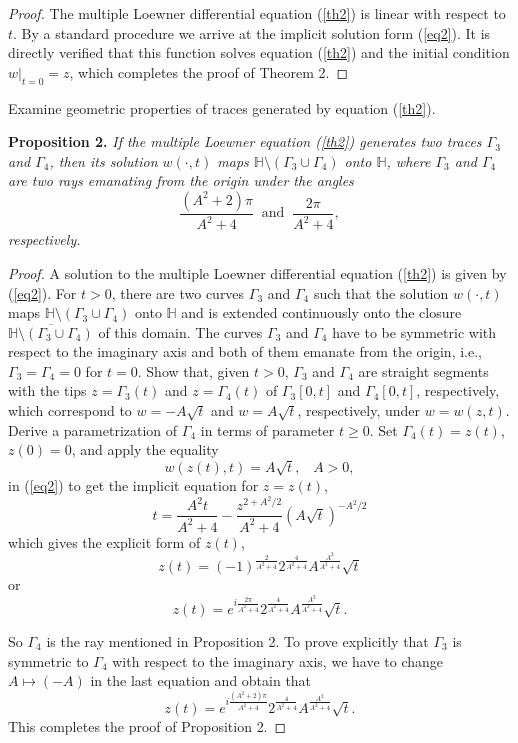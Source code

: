 \documentclass[
11pt,%
tightenlines,%
twoside,%
onecolumn,%
nofloats,%
nobibnotes,%
nofootinbib,%
superscriptaddress,%
noshowpacs,%
centertags]%
{revtex4}
\begin{document}
\begin{proof} The multiple Loewner differential equation (\ref{th2}) is linear with respect to $t$. By a standard procedure we arrive at the implicit solution form (\ref{eq2}). It is directly verified that this function solves equation (\ref{th2}) and the initial condition $w|_{t=0}=z$, which completes the proof of Theorem 2.
\end{proof}

Examine geometric properties of traces generated by equation (\ref{th2}).

{\bf Proposition 2.} {\it If the multiple Loewner equation (\ref{th2}) generates two traces $\Gamma_3$ and $\Gamma_4$, then its solution $w(\cdot,t)$ maps $\mathbb H\setminus(\Gamma_3\cup\Gamma_4)$ onto $\mathbb H$, where $\Gamma_3$ and $\Gamma_4$ are two rays emanating from the origin under the angles $$\frac{(A^2+2)\pi}{A^2+4}\;\;\text{and}\;\;\frac{2\pi}{A^2+4},$$ respectively.}

\begin{proof}

A solution to the multiple Loewner differential equation (\ref{th2}) is given by (\ref{eq2}). For $t>0$, there are two curves $\Gamma_3$ and $\Gamma_4$ such that the solution $w(\cdot,t)$ maps $\mathbb H\setminus(\Gamma_3\cup\Gamma_4)$ onto $\mathbb H$ and is extended continuously onto the closure $\overline{\mathbb H\setminus(\Gamma_3\cup\Gamma_4)}$ of this domain. The curves $\Gamma_3$ and $\Gamma_4$ have to be symmetric with respect to the imaginary axis and both of them emanate from the origin, i.e., $\Gamma_3=\Gamma_4=0$ for $t=0$. Show that, given $t>0$, $\Gamma_3$ and $\Gamma_4$ are straight segments with the tips $z=\Gamma_3(t)$ and $z=\Gamma_4(t)$ of $\Gamma_3[0,t]$ and $\Gamma_4[0,t]$, respectively, which correspond to $w=-A\sqrt t$ and $w=A\sqrt t$, respectively, under $w=w(z,t)$. Derive a parametrization of $\Gamma_4$ in terms of parameter $t\geq0$. Set $\Gamma_4(t)=z(t)$, $z(0)=0$, and apply the equality $$w(z(t),t)=A\sqrt t,\;\;\;A>0,$$ in (\ref{eq2}) to get the implicit equation for $z=z(t)$, $$t=\frac{A^2t}{A^2+4}-\frac{z^{2+A^2/2}}{A^2+4}(A\sqrt t)^{-A^2/2}$$ which gives the explicit form of $z(t)$, $$z(t)=(-1)^{\frac{2}{A^2+4}}2^{\frac{4}{A^2+4}}A^{\frac{A^2}{A^2+4}}\sqrt t$$ or $$z(t)=e^{i\frac{2\pi}{A^2+4}}2^{\frac{4}{A^2+4}}A^{\frac{A^2}{A^2+4}}\sqrt t.$$

So $\Gamma_4$ is the ray mentioned in Proposition 2. To prove explicitly that $\Gamma_3$ is symmetric to $\Gamma_4$ with respect to the imaginary axis, we have to change $A\mapsto(-A)$ in the last equation and obtain that $$z(t)=e^{i\frac{(A^2+2)\pi}{A^2+4}}2^{\frac{4}{A^2+4}}A^{\frac{A^2}{A^2+4}}\sqrt t.$$ This completes the proof of Proposition 2.
\end{proof}
\end{document}

